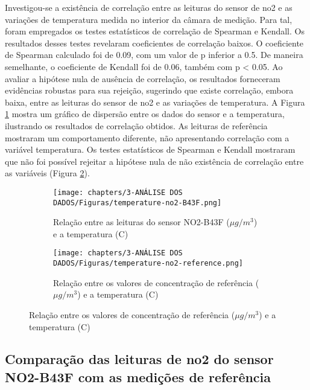 Investigou-se a existência de correlação entre as leituras do sensor de \acrshort{no2} e as variações de temperatura medida no interior da câmara de medição. Para tal, foram empregados os testes estatísticos de correlação de Spearman e Kendall. Os resultados desses testes revelaram coeficientes de correlação baixos. O coeficiente de Spearman calculado foi de 0.09, com um valor de p inferior a 0.5. De maneira semelhante, o coeficiente de Kendall foi de 0.06, também com p < 0.05. Ao avaliar a hipótese nula de ausência de correlação, os resultados forneceram evidências robustas para sua rejeição, sugerindo que existe correlação, embora baixa, entre as leituras do sensor de \acrshort{no2} e as variações de temperatura. A Figura \ref{fig:data-temp-no2-corr} mostra um gráfico de dispersão entre os dados do sensor e a temperatura, ilustrando os resultados de correlação obtidos. As leituras de referência mostraram um comportamento diferente, não apresentando correlação com a variável temperatura. Os testes estatísticos de Spearman e Kendall mostraram que não foi possível rejeitar a hipótese nula de não existência de correlação entre as variáveis (Figura \ref{fig:data-temp-no2-ref-corr}).

\begin{figure}[h]
    \centering
    \caption{Relação dos dados de concentração de \acrshort{no2} com a temperatura}
    \begin{subfigure}{0.4\textwidth}
        \texttt{[image: chapters/3-ANÁLISE DOS DADOS/Figuras/temperature-no2-B43F.png]}
        \caption{Relação entre as leituras do sensor NO2-B43F (\(\mu g/m^3\)) e a temperatura (\textdegree C)}
        \label{fig:data-temp-no2-corr}
    \end{subfigure}
    \hfill
    \begin{subfigure}{0.4\textwidth}
        \texttt{[image: chapters/3-ANÁLISE DOS DADOS/Figuras/temperature-no2-reference.png]}
        \caption{Relação entre os valores de concentração de referência (\(\mu g/m^3\)) e a temperatura (\textdegree C)}
        \label{fig:data-temp-no2-ref-corr}
    \end{subfigure}
    \hfill
    \label{fig:data-no2-temp}
\end{figure}

\subsection{Comparação das leituras de \acrshort{no2} do sensor NO2-B43F com as medições de referência}

